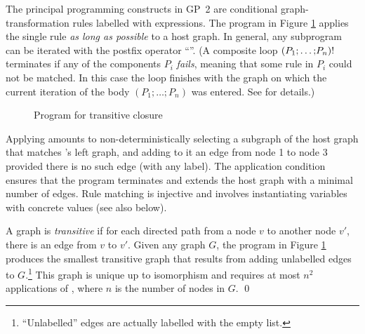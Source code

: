\begin{example}
The principal programming constructs in GP~2 are conditional graph-transformation rules labelled with expressions. The program in Figure \ref{fig:transitive-closure} applies the single rule  \emph{as long as possible} to a host graph. In general, any subprogram can be iterated with the postfix operator ``\ttt{!}''. (A composite loop $(P_1\mathtt{;}\dots\mathtt{;}P_n)\mathtt{!}$ terminates if any of the components $P_i$\/ \emph{fails}, meaning that some rule in $P_i$\/ could not be matched. In this case the loop finishes with the graph on which the current iteration of the body $(P_1;\dots;P_n)$ was entered. See \cite{Plump12a} for details.)

\begin{figure}[htb]
\begin{center}
 
\end{center}
\caption{Program for transitive closure}\label{fig:transitive-closure}
\end{figure}

Applying  amounts to non-deterministically selecting a subgraph of the host graph that matches 's left graph, and adding to it an edge from node 1 to node 3 provided there is no such edge (with any label). The application condition ensures that the program terminates and extends the host graph with a minimal number of edges. Rule matching is injective and involves instantiating variables with concrete values (see also below).

A graph is \emph{transitive} if for each directed path from a node $v$ to another node $v'$, there is an edge from $v$ to $v'$.  Given any graph $G$, the program in Figure \ref{fig:transitive-closure} produces the smallest transitive graph that results from adding unlabelled edges to $G$.\footnote{``Unlabelled'' edges are actually labelled with the empty list.} This graph is unique up to isomorphism and requires at most $n^2$ applications of , where $n$\/ is the number of nodes in $G$. \qed
\end{example}
  

